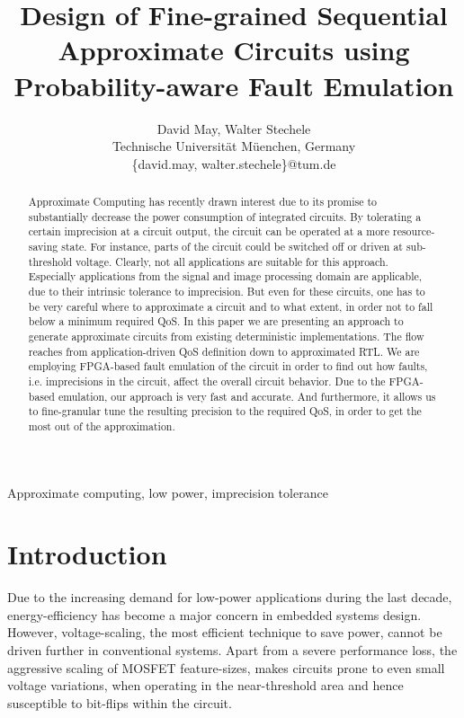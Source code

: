 \documentclass[10pt,twocolumn]{IEEEtran} %
\begin{document}
\title{Design of Fine-grained Sequential Approximate Circuits using Probability-aware Fault Emulation} %

\author{\large David May, Walter Stechele \\ 
Technische Universit\"at M\"uenchen, Germany \\
\{david.may, walter.stechele\}@tum.de}


\maketitle
\thispagestyle{empty}\pagestyle{empty}

\begin{abstract}
Approximate Computing has recently drawn interest due to its promise to substantially decrease the power consumption of integrated circuits. By tolerating a certain imprecision at a circuit output, the circuit can be operated at a more resource-saving state. For instance, parts of the circuit could be switched off or driven at sub-threshold voltage. Clearly, not all applications are suitable for this approach. Especially applications from the signal and image processing domain are applicable, due to their intrinsic tolerance to imprecision. But even for these circuits, one has to be very careful where to approximate a circuit and to what extent, in order not to fall below a minimum required QoS.
In this paper we are presenting an approach to generate approximate circuits from existing deterministic implementations. The flow reaches from application-driven QoS definition down to approximated RTL. We are employing FPGA-based fault emulation of the circuit in order to find out how faults, i.e. imprecisions in the circuit, affect the overall circuit behavior.
Due to the FPGA-based emulation, our approach is very fast and accurate. And furthermore, it allows us to fine-granular tune the resulting precision to the required QoS, in order to get the most out of the approximation.
\end{abstract}

\begin{keywords}
Approximate computing, low power, imprecision tolerance
\end{keywords}

\section{\bf{Introduction}}
Due to the increasing demand for low-power applications during the last decade, energy-efficiency has become a major concern in embedded systems design. However, voltage-scaling, the most efficient technique to save power, cannot be driven further in conventional systems. Apart from a severe performance loss, the aggressive scaling of \mbox{MOSFET} feature-sizes, makes circuits prone to even small voltage variations, when operating in the near-threshold area and hence susceptible to bit-flips within the circuit.
\end{document}
